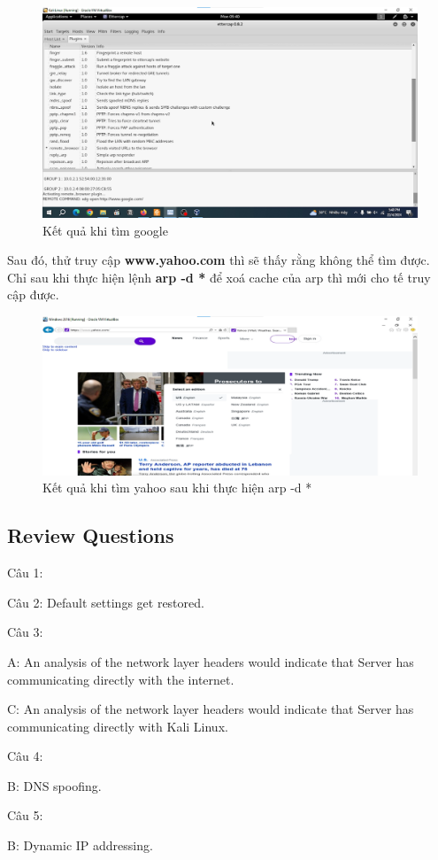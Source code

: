 \begin{figure}[!htb]
    \centering
    \includegraphics[width=1\linewidth]{figure//chapter5//lab5_4/result_searching_google.png}
    \caption{Kết quả khi tìm google}
    \label{fig:enter-label}
\end{figure}

 Sau đó, thử truy cập \textbf{www.yahoo.com} thì sẽ thấy rằng không thể tìm được. Chỉ sau khi thực hiện lệnh \textbf{arp -d *} để xoá cache của arp thì mới cho tế truy cập được.

\begin{figure}[!htb]
    \centering
    \includegraphics[width=1\linewidth]{figure//chapter5//lab5_4/result_search_yahoo.png}
    \caption{Kết quả khi tìm yahoo sau khi thực hiện arp -d *}
    \label{fig:enter-label}
\end{figure}

\newpage

\subsection{Review Questions}

\noindent Câu 1:

\noindent Câu 2: Default settings get restored.

\noindent Câu 3: 

A: An analysis of the network layer headers would indicate that Server has communicating directly with the internet.

C: An analysis of the network layer headers would indicate that Server has communicating directly with Kali Linux.

\noindent Câu 4: 

B: DNS spoofing.

\noindent Câu 5:

B: Dynamic IP addressing.

\newpage